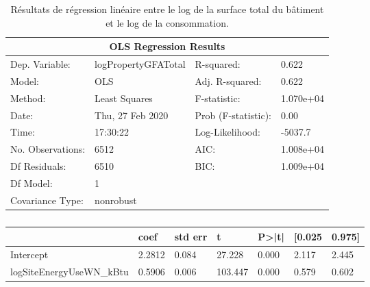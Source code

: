 \begin{table*}[p]
  \caption{Résultats de régression linéaire entre le log de la surface total du bâtiment
  et le log de la consommation.}

  \centering
\begin{tabular}{@{}llll@{}}
\toprule
\multicolumn{4}{c}{OLS Regression Results}                                \\ \midrule
Dep. Variable:    & logPropertyGFATotal & R-squared:          & 0.622     \\
Model:            & OLS                 & Adj. R-squared:     & 0.622     \\
Method:           & Least Squares       & F-statistic:        & 1.070e+04 \\
Date:             & Thu, 27 Feb 2020    & Prob (F-statistic): & 0.00      \\
Time:             & 17:30:22            & Log-Likelihood:     & -5037.7   \\
No. Observations: & 6512                & AIC:                & 1.008e+04 \\
Df Residuals:     & 6510                & BIC:                & 1.009e+04 \\
Df Model:         & 1                   &                     &           \\
Covariance Type:  & nonrobust           &                     &           \\ \bottomrule
\end{tabular}
\end{table*}

\begin{table*}[p]
  \caption{}

  \centering
\begin{tabular}{@{}lllllll@{}}
\toprule
  & coef                     & std err & t     & P\textgreater{}|t| & {[}0.025 & 0.975{]}        \\ \midrule
Intercept                & 2.2812  & 0.084 & 27.228             & 0.000    & 2.117    & 2.445 \\
logSiteEnergyUseWN\_kBtu & 0.5906  & 0.006 & 103.447            & 0.000    & 0.579    & 0.602 \\ \bottomrule
\end{tabular}
\end{table*}
